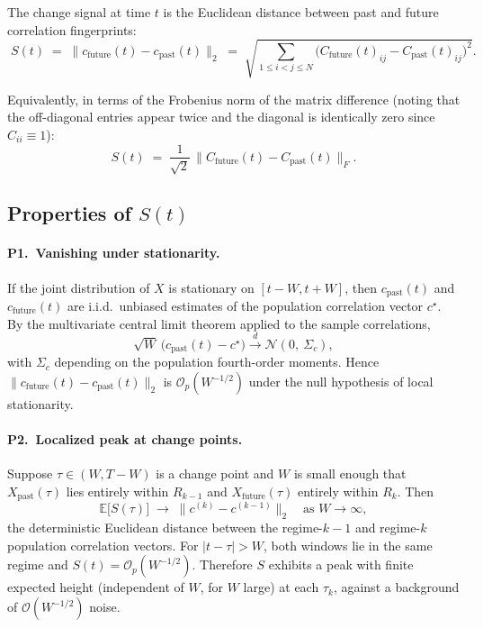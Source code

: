 \documentclass[11pt,a4paper]{article}
\newcommand{\E}{\mathbb{E}}
\begin{document}
The change signal at time $t$ is the Euclidean distance between past and
future correlation fingerprints:
\begin{equation}
\boxed{\;
S(t) \;=\; \big\| c_{\text{future}}(t) - c_{\text{past}}(t) \big\|_2
\;=\; \sqrt{\sum_{1 \le i < j \le N}\!\big(C_{\text{future}}(t)_{ij} - C_{\text{past}}(t)_{ij}\big)^2}.
\;}
\label{eq:change-signal}
\end{equation}

Equivalently, in terms of the Frobenius norm of the matrix difference
(noting that the off-diagonal entries appear twice and the diagonal is
identically zero since $C_{ii} \equiv 1$):
\begin{equation}
S(t) \;=\; \frac{1}{\sqrt{2}}\, \big\| C_{\text{future}}(t) - C_{\text{past}}(t) \big\|_F.
\end{equation}

\subsection{Properties of $S(t)$}

\paragraph{P1.\ Vanishing under stationarity.}
If the joint distribution of $X$ is stationary on $[t - W, t + W]$, then
$c_{\text{past}}(t)$ and $c_{\text{future}}(t)$ are i.i.d.\ unbiased estimates
of the population correlation vector $c^\star$. By the multivariate
central limit theorem applied to the sample correlations,
\begin{equation}
\sqrt{W}\,\big(c_{\text{past}}(t) - c^\star\big)
\xrightarrow{\,d\,} \mathcal{N}(0,\ \Sigma_c),
\end{equation}
with $\Sigma_c$ depending on the population fourth-order moments. Hence
$\big\| c_{\text{future}}(t) - c_{\text{past}}(t) \big\|_2$ is
$\mathcal{O}_p(W^{-1/2})$ under the null hypothesis of local stationarity.

\paragraph{P2.\ Localized peak at change points.}
Suppose $\tau \in (W, T - W)$ is a change point and $W$ is small enough that
$X_{\text{past}}(\tau)$ lies entirely within $R_{k-1}$ and
$X_{\text{future}}(\tau)$ entirely within $R_k$. Then
\begin{equation}
\E\!\big[S(\tau)\big] \;\to\; \big\| c^{(k)} - c^{(k-1)} \big\|_2
\quad \text{as } W \to \infty,
\end{equation}
the deterministic Euclidean distance between the regime-$k-1$ and regime-$k$
population correlation vectors. For $|t - \tau| > W$, both windows lie in
the same regime and $S(t) = \mathcal{O}_p(W^{-1/2})$. Therefore $S$ exhibits
a peak with finite expected height (independent of $W$, for $W$ large) at
each $\tau_k$, against a background of $\mathcal{O}(W^{-1/2})$ noise.
\end{document}
